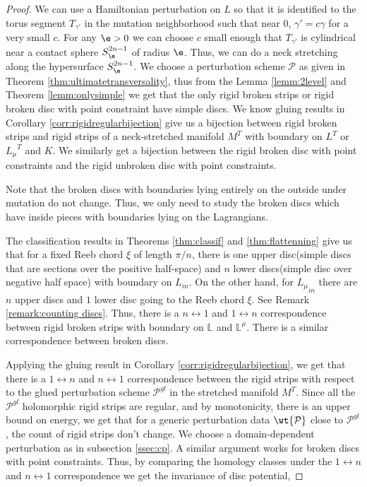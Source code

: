 \begin{proof}

We can use a Hamiltonian perturbation on $L$ so that it is identified to the torus segment  $T_{\gamma'}$ in the mutation neighborhood such that near 0, $\gamma' = c\gamma$ for a very small $c$. For any $\e>0$ we can choose $c$ small enough that $T_{\gamma'}$ is cylindrical near a contact sphere $S^{2n-1}_\e$ of radius $\e$. Thus, we can do a neck stretching along the hypersurface $S^{2n-1}_\e$. We choose a perturbation scheme $\mathcal{P}$ as given in Theorem \ref{thm:ultimatetransversality}, thus  from the Lemma \ref{lemm:2level} and Theorem \ref{lemm:onlysimple} we get that the only rigid broken strips or rigid broken disc with point constraint have simple discs. We know gluing results in Corollary \ref{corr:rigidregularbijection} give us a bijection between rigid broken strips and rigid strips of a neck-stretched manifold $M^T$ with boundary on $L^T$ or ${L_\mu}^T$ and $K$. We similarly get a bijection between the rigid broken disc with point constraints and the rigid unbroken disc with point constraints.

Note that the broken discs with boundaries lying entirely on the outside under mutation do not change. Thus, we only need to study the broken discs which have inside pieces with boundaries lying on the Lagrangians.

The classification results in Theorems \ref{thm:classif} and \ref{thm:flattenning} give us that for a fixed Reeb chord $\xi$ of length $\pi/n$, there is  one upper disc(simple discs that are sections over the positive half-space) and $n$ lower discs(simple disc over negative half space) with boundary on $L_{in}$. On the other hand, for ${L_\mu}_{in}$ there are $n$ upper discs and $1$ lower disc going to the Reeb chord $\xi$. See Remark \ref{remark:counting discs}. Thus, there is  a $n\longleftrightarrow1$ and $1\longleftrightarrow n$ correspondence between rigid broken strips with boundary on $\mathbb{L}$ and $\mathbb{L}^\mu$. There is a similar correspondence between broken discs.

Applying the gluing result in Corollary \ref{corr:rigidregularbijection}, we get that there is a $1\leftrightarrow n$ and $n\leftrightarrow1$ correspondence between the rigid strips with respect to the glued perturbation scheme $\mathcal{P}^{gl}$ in the stretched manifold $M^T$. Since all the  $\mathcal{P}^{gl}$ holomorphic rigid strips are regular, and by monotonicity, there is an upper bound on energy, we get that for a generic perturbation data $\wt {\mathcal{P}}$ close to $\mathcal{P}^{gl}$, the count of rigid strips don't change. We choose a domain-dependent perturbation as in subsection \ref{ssec:cp}. A similar argument works for broken discs with point constraints. Thus, by comparing the homology classes under the $1\leftrightarrow n$ and $n\leftrightarrow1$ correspondence we get the invariance of disc potential,


\end{proof}
